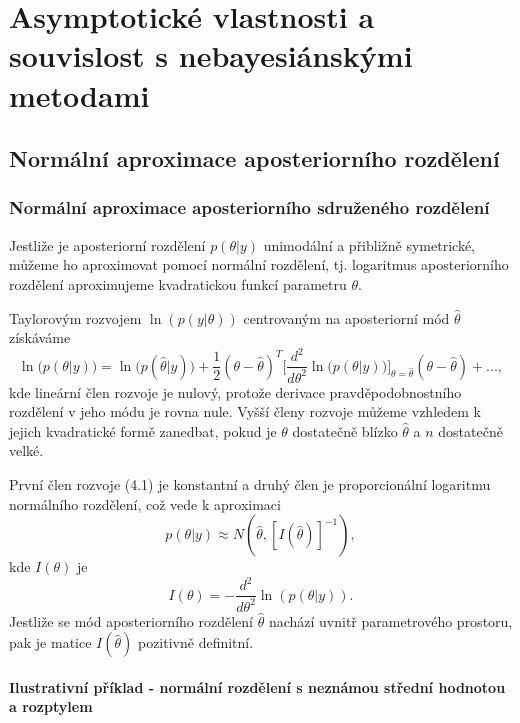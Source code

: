 \chapter{Asymptotické vlastnosti a souvislost s nebayesiánskými\\ metodami}

\section{Normální aproximace aposteriorního rozdělení}

\subsection{Normální aproximace aposteriorního sdruženého rozdělení}

Jestliže je aposteriorní rozdělení $p(\theta|y)$ unimodální a přibližně symetrické, můžeme ho aproximovat pomocí normální rozdělení, tj. logaritmus aposteriorního rozdělení aproximujeme kvadratickou funkcí parametru $\theta$.

Taylorovým rozvojem $\ln(p(y|\theta))$ centrovaným na aposteriorní mód $\hat{\theta}$ získáváme
\begin{equation}
\ln\big(p(\theta|y)\big) = \ln\big(p(\hat{\theta}|y)\big) + \frac{1}{2}(\theta - \hat{\theta})^T \Big[\frac{d^2}{d \theta^2}\ln\big(p(\theta|y)\big)\Big]_{\theta = \hat{\theta}}(\theta - \hat{\theta}) + ...,
\end{equation}
kde lineární člen rozvoje je nulový, protože derivace pravděpodobnostního rozdělení v jeho módu je rovna nule. Vyšší členy rozvoje můžeme vzhledem k jejich kvadratické formě zanedbat, pokud je $\theta$ dostatečně blízko $\hat{\theta}$ a $n$ dostatečně velké.

První člen rozvoje (4.1) je konstantní a druhý člen je proporcionální logaritmu normálního rozdělení, což vede k aproximaci
\begin{equation}
p(\theta | y) \approx N(\hat{\theta}, [I(\hat{\theta})]^{-1}),
\end{equation}
kde $I(\theta)$ je
\begin{equation}
I(\theta) = - \frac{d^2}{d \theta^2} \ln(p(\theta|y)).
\end{equation}
Jestliže se mód aposteriorního rozdělení $\hat{\theta}$ nachází uvnitř parametrového prostoru, pak je matice $I(\hat{\theta})$ pozitivně definitní.

\subsubsection{Ilustrativní příklad - normální rozdělení s neznámou střední hodnotou a rozptylem}

